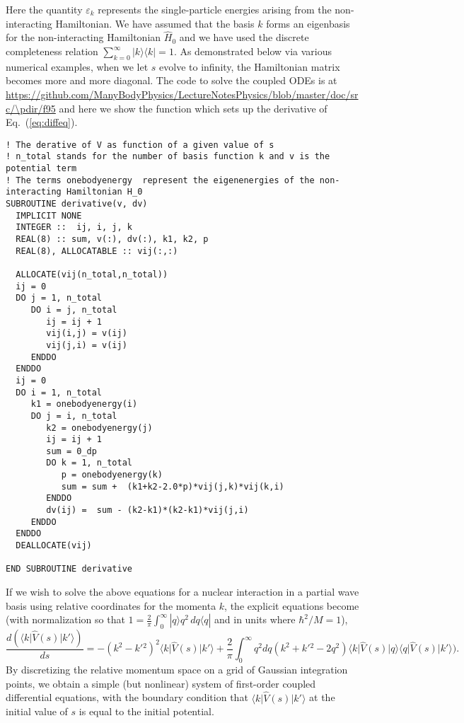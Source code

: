 Here the quantity $\varepsilon_k$ represents the single-particle
energies arising from the non-interacting Hamiltonian. We have assumed
that the basis $k$ forms an eigenbasis for the non-interacting
Hamiltonian $\hat{H}_0$ and we have used the discrete completeness
relation $\sum_{k=0}^{\infty}\vert k \rangle \langle k \vert = 1$.  As
demonstrated below via various numerical examples, when we let $s$
evolve to infinity, the Hamiltonian matrix becomes more and more
diagonal. The code to solve the coupled ODEs is at
\url{https://github.com/ManyBodyPhysics/LectureNotesPhysics/blob/master/doc/src/\pdir/f95} and here we show the function which sets up the derivative of Eq.~(\ref{eq:diffeq}). 
\begin{lstlisting}
! The derative of V as function of a given value of s
! n_total stands for the number of basis function k and v is the potential term
! The terms onebodyenergy  represent the eigenenergies of the non-interacting Hamiltonian H_0
SUBROUTINE derivative(v, dv)
  IMPLICIT NONE
  INTEGER ::  ij, i, j, k
  REAL(8) :: sum, v(:), dv(:), k1, k2, p
  REAL(8), ALLOCATABLE :: vij(:,:)

  ALLOCATE(vij(n_total,n_total)) 
  ij = 0
  DO j = 1, n_total
     DO i = j, n_total
        ij = ij + 1
        vij(i,j) = v(ij)
        vij(j,i) = v(ij)
     ENDDO
  ENDDO
  ij = 0
  DO i = 1, n_total
     k1 = onebodyenergy(i) 
     DO j = i, n_total
        k2 = onebodyenergy(j) 
        ij = ij + 1
        sum = 0_dp
        DO k = 1, n_total
           p = onebodyenergy(k) 
           sum = sum +  (k1+k2-2.0*p)*vij(j,k)*vij(k,i) 
        ENDDO
        dv(ij) =  sum - (k2-k1)*(k2-k1)*vij(j,i)
     ENDDO
  ENDDO
  DEALLOCATE(vij)

END SUBROUTINE derivative
\end{lstlisting}
If we wish to solve the above equations for a nuclear interaction in a
partial wave basis using relative coordinates for the momenta $k$, the explicit equations
become \cite{Bogner:2007od} (with normalization
so that $1 = \frac{2}{\pi}\int_0^\infty|q\rangle q^2\,dq \langle q |$
and in units where $\hbar^2/M = 1$),
%
\begin{equation}
  \frac{d(\langle k \vert \hat{V}(s) \vert k'\rangle)}{ds} =- (k^2 - k'{}^2)^2\langle k \vert \hat{V}(s) \vert k'\rangle
    + \frac{2}{\pi}\int_0^{\infty}q^2dq
      (k^2 + k'{}^2 - 2q^2)\langle k \vert \hat{V}(s) \vert q\rangle\langle q \vert \hat{V}(s) \vert k'\rangle).
\end{equation}
By discretizing the relative momentum space on a grid of Gaussian integration points, 
we obtain a simple (but nonlinear) system of first-order
coupled differential equations,
with the boundary condition that $\langle k \vert \hat{V}(s) \vert k'\rangle$ at the initial
value of $s$ is equal to the initial potential.

